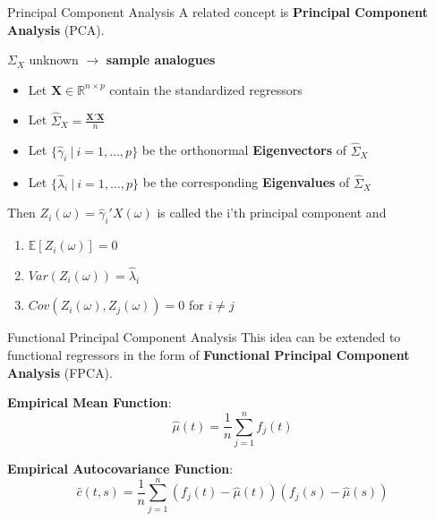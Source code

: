 \documentclass{beamer}
\begin{document}
	\begin{frame}{Principal Component Analysis}
		A related concept is \textbf{Principal Component Analysis} (PCA).
		\vspace{0.2cm}
		
		$\Sigma_X$ unknown $\rightarrow$ \textbf{sample analogues}
	
		\begin{itemize}
			\item Let $\mathbf{X} \in \mathbb{R}^{n \times p}$ contain the standardized regressors
			\item Let $\hat{\Sigma}_X = \frac{\mathbf{X}'\mathbf{X}}{n}$
			\item Let $\{\hat{\gamma}_i \: \vert \: i = 1, \dots, p\}$ be the orthonormal \textbf{Eigenvectors} of $\hat{\Sigma}_X$
			\item Let $\{\hat{\lambda}_i \: \vert \: i = 1, \dots, p\}$ be the corresponding \textbf{Eigenvalues} of $\hat{\Sigma}_X$
		\end{itemize}
		\vspace{0.2cm} 
		
		Then $Z_i(\omega) = \hat{\gamma}_i' X(\omega)$ is called the i'th principal component and
		\begin{multicols}{2}
			\begin{enumerate}
				\item $\mathbb{E}[Z_i(\omega)] = 0$
				\item $Var(Z_i(\omega)) = \hat{\lambda}_i$
				\item $Cov(Z_i(\omega), Z_j(\omega)) = 0$ for $i \neq j$
			\end{enumerate}
		\end{multicols}
	\end{frame}

	\begin{frame}{Functional Principal Component Analysis}
		This idea can be extended to functional regressors in the form of \textbf{Functional Principal Component Analysis} (FPCA).
		\vspace{0.2cm}
		
		\textbf{Empirical Mean Function}:
		$$\hat{\mu}(t) = \frac{1}{n}\sum_{j = 1}^{n}f_j(t)$$

		\textbf{Empirical Autocovariance Function}:
		$$\hat{c}(t,s) = \frac{1}{n} \sum_{j = 1}^{n} \left(f_j(t) - \hat{\mu}(t)\right) \left(f_j(s) - \hat{\mu}(s)\right)$$

	\end{frame}
\end{document}
